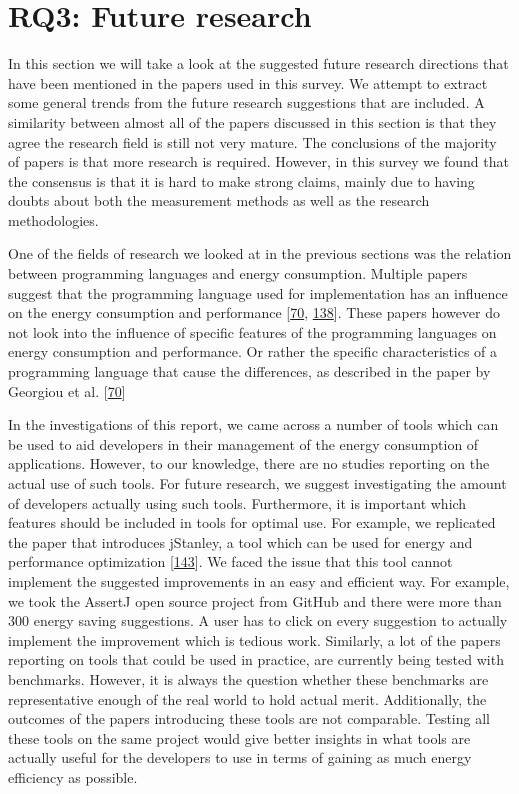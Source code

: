 \documentclass[]{book}
\begin{document}
\section{RQ3: Future research}\label{rq3-future-research-1}

In this section we will take a look at the suggested future research
directions that have been mentioned in the papers used in this survey.
We attempt to extract some general trends from the future research
suggestions that are included. A similarity between almost all of the
papers discussed in this section is that they agree the research field
is still not very mature. The conclusions of the majority of papers is
that more research is required. However, in this survey we found that
the consensus is that it is hard to make strong claims, mainly due to
having doubts about both the measurement methods as well as the research
methodologies.

One of the fields of research we looked at in the previous sections was
the relation between programming languages and energy consumption.
Multiple papers suggest that the programming language used for
implementation has an influence on the energy consumption and
performance {[}\protect\hyperlink{ref-GKLS2018}{70},
\protect\hyperlink{ref-OOC2017}{138}{]}. These papers however do not
look into the influence of specific features of the programming
languages on energy consumption and performance. Or rather the specific
characteristics of a programming language that cause the differences, as
described in the paper by Georgiou et al.
{[}\protect\hyperlink{ref-GKLS2018}{70}{]}

In the investigations of this report, we came across a number of tools
which can be used to aid developers in their management of the energy
consumption of applications. However, to our knowledge, there are no
studies reporting on the actual use of such tools. For future research,
we suggest investigating the amount of developers actually using such
tools. Furthermore, it is important which features should be included in
tools for optimal use. For example, we replicated the paper that
introduces jStanley, a tool which can be used for energy and performance
optimization {[}\protect\hyperlink{ref-PSCS2018}{143}{]}. We faced the
issue that this tool cannot implement the suggested improvements in an
easy and efficient way. For example, we took the AssertJ open source
project from GitHub and there were more than 300 energy saving
suggestions. A user has to click on every suggestion to actually
implement the improvement which is tedious work. Similarly, a lot of the
papers reporting on tools that could be used in practice, are currently
being tested with benchmarks. However, it is always the question whether
these benchmarks are representative enough of the real world to hold
actual merit. Additionally, the outcomes of the papers introducing these
tools are not comparable. Testing all these tools on the same project
would give better insights in what tools are actually useful for the
developers to use in terms of gaining as much energy efficiency as
possible.
\end{document}

